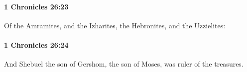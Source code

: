 		\paragraph{1 Chronicles 26:23} %
			\label{1CHRONICLES-26-23}

			Of the Amramites, and the Izharites, the Hebronites, and the Uzzielites:


		\paragraph{1 Chronicles 26:24} %
			\label{1CHRONICLES-26-24}

			And Shebuel the son of Gershom, the son of Moses, was ruler of the treasures.


